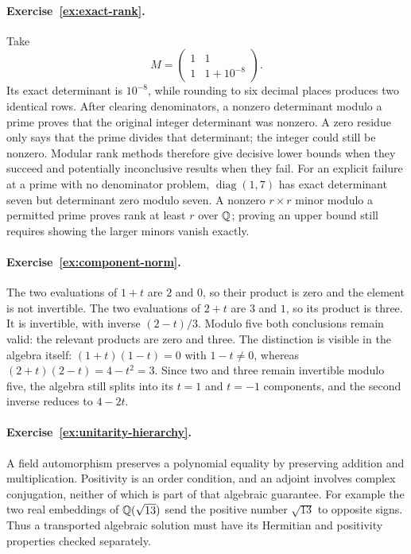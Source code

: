 \paragraph{Exercise~\ref{ex:exact-rank}.}
\label{sol:ex:exact-rank}
Take
\[
 M=\begin{pmatrix}1&1\\1&1+10^{-8}\end{pmatrix}.
\]
Its exact determinant is $10^{-8}$, while rounding to six decimal
places produces two identical rows.  After clearing denominators,
a nonzero determinant modulo a prime proves that the original
integer determinant was nonzero.  A zero residue only says that
the prime divides that determinant; the integer could still be
nonzero.  Modular rank methods therefore give decisive lower
bounds when they succeed and potentially inconclusive results
when they fail.
For an explicit failure at a prime with no denominator problem,
$\operatorname{diag}(1,7)$ has exact determinant seven but
determinant zero modulo seven. A nonzero $r\times r$ minor
modulo a permitted prime proves rank at least $r$ over $\mathbb Q$;
proving an upper bound still requires showing the larger minors
vanish exactly.



\paragraph{Exercise~\ref{ex:component-norm}.}
\label{sol:ex:component-norm}
The two evaluations of $1+t$ are $2$ and $0$, so their product
is zero and the element is not invertible.  The two evaluations
of $2+t$ are $3$ and $1$, so its product is three.  It is
invertible, with inverse $(2-t)/3$.  Modulo five both conclusions
remain valid: the relevant products are zero and three.
The distinction is visible in the algebra itself:
$(1+t)(1-t)=0$ with $1-t\ne0$, whereas
$(2+t)(2-t)=4-t^2=3$. Since two and three remain invertible
modulo five, the algebra still splits into its $t=1$ and $t=-1$
components, and the second inverse reduces to $4-2t$.



\paragraph{Exercise~\ref{ex:unitarity-hierarchy}.}
\label{sol:ex:unitarity-hierarchy}
A field automorphism preserves a polynomial equality by preserving
addition and multiplication.  Positivity is an order condition,
and an adjoint involves complex conjugation, neither of which is
part of that algebraic guarantee.  For example the two real
embeddings of $\mathbb Q(\sqrt{13})$ send the positive number
$\sqrt{13}$ to opposite signs.  Thus a transported algebraic
solution must have its Hermitian and positivity properties
checked separately.


